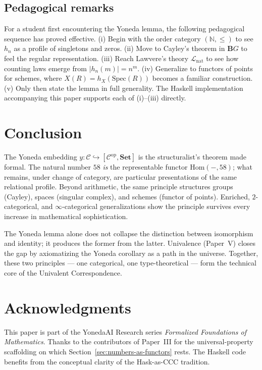 \documentclass[12pt]{article}
\theoremstyle{definition}
\theoremstyle{remark}
\begin{document}
\subsection{Pedagogical remarks}

For a student first encountering the Yoneda lemma, the following pedagogical sequence has proved effective. (i) Begin with the order category $(\mathbb{N}, \le)$ to see $h_n$ as a profile of singletons and zeros. (ii) Move to Cayley's theorem in $\mathbf{B}G$ to feel the regular representation. (iii) Reach Lawvere's theory $\mathcal{L}_{\mathrm{nat}}$ to see how counting laws emerge from $|h_n(m)| = n^m$. (iv) Generalize to functors of points for schemes, where $X(R) = h_X(\mathrm{Spec}(R))$ becomes a familiar construction. (v) Only then state the lemma in full generality. The Haskell implementation accompanying this paper supports each of (i)--(iii) directly.

\section{Conclusion}
\label{sec:conclusion}

The Yoneda embedding $y\colon \mathcal{C} \hookrightarrow [\mathcal{C}^{\mathrm{op}}, \mathbf{Set}]$ is the structuralist's theorem made formal. The natural number $58$ \emph{is} the representable functor $\mathrm{Hom}(-, 58)$; what remains, under change of category, are particular presentations of the same relational profile. Beyond arithmetic, the same principle structures groups (Cayley), spaces (singular complex), and schemes (functor of points). Enriched, $2$-categorical, and $\infty$-categorical generalizations show the principle survives every increase in mathematical sophistication.

The Yoneda lemma alone does not collapse the distinction between isomorphism and identity; it produces the former from the latter. Univalence (Paper~V) closes the gap by axiomatizing the Yoneda corollary as a path in the universe. Together, these two principles --- one categorical, one type-theoretical --- form the technical core of the Univalent Correspondence.

\section*{Acknowledgments}

This paper is part of the YonedaAI Research series \emph{Formalized Foundations of Mathematics}. Thanks to the contributors of Paper~III for the universal-property scaffolding on which Section~\ref{sec:numbers-as-functors} rests. The Haskell code benefits from the conceptual clarity of the Hask-as-CCC tradition.
\end{document}
